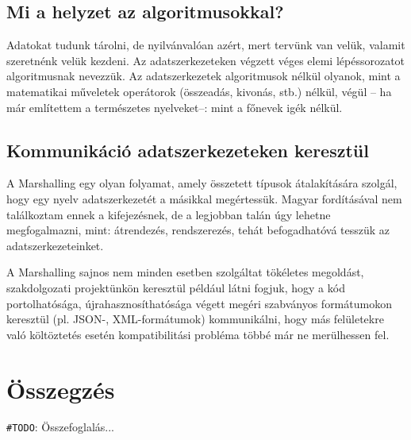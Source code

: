 \documentclass[tocnopagenum]{thesis-ekf}
\newtheorem{tetel}{Tétel}[chapter]
\theoremstyle{definition}
\newtheorem{definicio}[tetel]{Definíció}
\theoremstyle{remark}
\newtheorem{megjegyzes}[tetel]{Megjegyzés}
\begin{document}
	\section{Mi a helyzet az algoritmusokkal?}
	Adatokat tudunk tárolni, de nyilvánvalóan azért, mert tervünk van velük, valamit szeretnénk velük kezdeni. Az adatszerkezeteken végzett véges elemi lépéssorozatot algoritmusnak nevezzük. Az adatszerkezetek algoritmusok nélkül olyanok, mint a matematikai műveletek operátorok (összeadás, kivonás, stb.) nélkül, végül -- ha már említettem a természetes nyelveket--: mint a főnevek igék nélkül.
	\section{Kommunikáció adatszerkezeteken keresztül}
	A Marshalling egy olyan folyamat, amely összetett típusok átalakítására szolgál, hogy egy nyelv adatszerkezetét a másikkal megértessük. Magyar fordításával nem találkoztam ennek a kifejezésnek, de a legjobban talán úgy lehetne megfogalmazni, mint: átrendezés, rendszerezés, tehát befogadhatóvá tesszük az adatszerkezeteinket.
	\par
	A Marshalling sajnos nem minden esetben szolgáltat tökéletes megoldást, szakdolgozati projektünkön keresztül például látni fogjuk, hogy a kód portolhatósága, újrahasznosíthatósága végett megéri szabványos formátumokon keresztül (pl. JSON-, XML-formátumok) kommunikálni, hogy más felületekre való költöztetés esetén kompatibilitási probléma többé már ne merülhessen fel.
	\begin{comment}
		Ezek később lesznek hasznosak
		\begin{tetel}
			Tétel szövege.
		\end{tetel}
		
		\begin{proof}
			Bizonyítás szövege.
		\end{proof}
		
		\begin{definicio}
			Definíció szövege.
		\end{definicio}
		
		\begin{megjegyzes}
			Megjegyzés szövege.
		\end{megjegyzes}
	\end{comment}
	
	\chapter*{Összegzés}
	\verb*|#TODO|: Összefoglalás...
	
	
	
\end{document}
